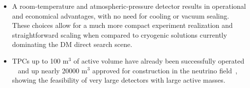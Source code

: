 \documentclass[physics,article,submit,moreauthors,pdftex]{Definitions/mdpi}
\newcommand{\keV}{\ensuremath{\,\textrm{keV}}\xspace}
\begin{document}
\begin{itemize}
\item A room-temperature and atmospheric-pressure detector results in operational and economical advantages, with no need for cooling or vacuum sealing. These choices allow for a much more compact experiment realization and straightforward scaling when compared to cryogenic solutions currently dominating the DM direct search scene.

\item TPCs up to 100 m$^{3}$ of active volume have already been successfully operated ~\cite{bib:alice, bib:tpc4} and up nearly 20000 m$^{3}$ approved for construction in the neutrino field~\cite{bib:dune}, showing the feasibility of very large detectors with large active masses.
\end{itemize}



\end{document}
